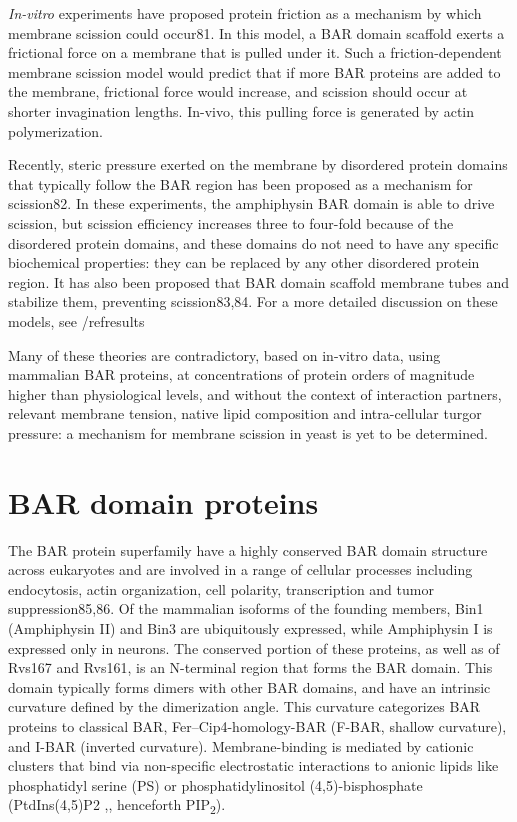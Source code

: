 			\vspace{5mm}
			\textit{In-vitro} experiments have proposed protein friction as a mechanism by which membrane scission could occur81. In this model, a BAR domain scaffold exerts a frictional force on a membrane that is pulled under it. Such a friction-dependent membrane scission model would predict that if more BAR proteins are added to the membrane, frictional force would increase, and scission should occur at shorter invagination lengths. In-vivo, this pulling force is generated by actin polymerization. 


			\vspace{5mm}
			Recently, steric pressure exerted on the membrane by disordered protein domains that typically follow the BAR region has been proposed as a mechanism for scission82. In these experiments, the amphiphysin BAR domain is able to drive scission, but scission efficiency increases three to four-fold because of the disordered protein domains, and these domains do not need to have any specific biochemical properties: they can be replaced by any other disordered protein region. It has also been proposed that BAR domain scaffold membrane tubes and stabilize them, preventing scission83,84. For a more detailed discussion on these models, see /ref{results}


			\vspace{5mm}
			Many of these theories are contradictory, based on in-vitro data, using mammalian BAR proteins, at concentrations of protein orders of magnitude higher than physiological levels, and without the context of interaction partners, relevant membrane tension, native lipid composition and intra-cellular turgor pressure: a mechanism for membrane scission in yeast is yet to be determined. 


		
\section{BAR domain proteins}
	
The BAR protein superfamily have a highly conserved BAR domain structure across eukaryotes and are involved in a range of cellular processes including endocytosis, actin organization, cell polarity, transcription and tumor suppression85,86. 
Of the mammalian isoforms of the founding members, Bin1 (Amphiphysin II) and Bin3 are ubiquitously expressed, while Amphiphysin I is expressed only in neurons. The conserved portion of these proteins, as well as of Rvs167 and Rvs161, is an N-terminal region that forms the BAR domain. This domain typically forms dimers with other BAR domains, and have an intrinsic curvature defined by the dimerization angle. This curvature categorizes BAR proteins to classical BAR, Fer–Cip4-homology-BAR (F-BAR, shallow curvature), and I-BAR (inverted curvature). Membrane-binding is mediated by cationic clusters that bind via non-specific electrostatic interactions to anionic lipids like phosphatidyl serine (PS) or phosphatidylinositol (4,5)-bisphosphate (PtdIns(4,5)P2 ,, henceforth PIP\textsubscript{2}).

